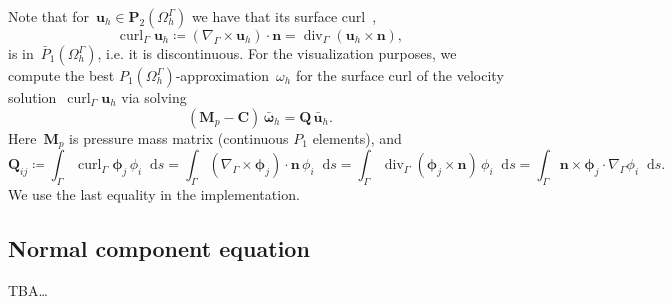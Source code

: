 \documentclass[12pt]{article}
\newcommand{\vect}[1]{\boldsymbol{\mathbf{#1}}}
\newcommand*\diff{\mathop{}\!\mathrm{d}}
\DeclareMathOperator{\Div}{div}
\DeclareMathOperator{\Curl}{curl}
\begin{document}
Note that for~$\vect u_h \in \vect P_2(\Omega^\Gamma_h)$ we have that its surface curl~\cite{10.1093/imanum/dry062},
$$
	\Curl_\Gamma \vect u_h \coloneqq (\nabla_\Gamma\times\vect u_h)\cdot \vect n = \Div_\Gamma(\vect u_h\times\vect n),
$$
is in~$\bar P_1(\Omega^\Gamma_h)$, i.e. it is discontinuous. For the visualization purposes, we compute the best $P_1(\Omega^\Gamma_h)$-approximation~$\omega_h$ for the surface curl of the velocity solution~$\Curl_\Gamma \vect u_h$ via solving
$$
	(\vect M_p - \vect C)\,\bar{\vect\omega}_h = \vect Q\,\bar{\vect u}_h.
$$
Here~$\vect M_p$ is pressure mass matrix (continuous $P_1$ elements), and
$$
	\vect Q_{ij} \coloneqq \int_\Gamma \Curl_\Gamma\vect\phi_j\,\phi_i\diff{s} = \int_\Gamma (\nabla_\Gamma\times\vect\phi_j)\cdot \vect n\,\phi_i\diff{s} = \int_\Gamma \Div_\Gamma(\vect\phi_j\times\vect n)\,\phi_i\diff{s}
	 = \int_\Gamma \vect n\times\vect\phi_j\cdot\nabla_\Gamma\phi_i\diff{s}.
$$
We use the last equality in the implementation.

\subsection{Normal component equation}

TBA\dots
\end{document}
